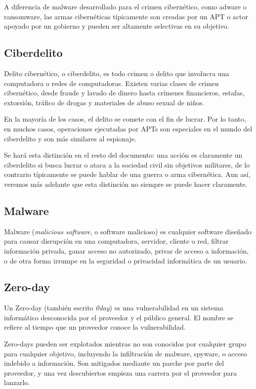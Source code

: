 \documentclass{article}
\begin{document}
A diferencia de malware desarrollado para el crimen cibernético, como adware o ransomware, las armas cibernéticas típicamente son creadas por un APT o actor apoyado por un gobierno y pueden ser altamente selectivas en su objetivo. \autocite{stevens-cyberweapons}

\subsection{Ciberdelito}
Delito cibernético, o ciberdelito, es todo crimen o delito que involucra una computadora o redes de computadoras. Existen varias clases de crimen cibernético, desde fraude y lavado de dinero hasta crímenes financieros, estafas, extorsión, tráfico de drogas y materiales de abuso sexual de niños.

En la mayoría de los casos, el delito se comete con el fin de lucrar. Por lo tanto, en muchos casos, operaciones ejecutadas por APTs son especiales en el mundo del ciberdelito y son más similares al espionaje.

Se hará esta distinción en el resto del documento: una acción es claramente un ciberdelito si busca lucrar o ataca a la sociedad civil sin objetivos militares, de lo contrario típicamente se puede hablar de una guerra o arma cibernética. Aun así, veremos más adelante que esta distinción no siempre se puede hacer claramente. \autocite{cybercrime-britannica}

\subsection{Malware}
Malware ({\it malicious software}, o software malicioso) es cualquier software diseñado para causar disrupción en una computadora, servidor, cliente o red, filtrar información privada, ganar acceso no autorizado, privar de acceso a información, o de otra forma irrumpe en la seguridad o privacidad informática de un usuario. \autocite{tahir-malware}

\subsection{Zero-day}
Un Zero-day (también escrito {\it 0day}) es una vulnerabilidad en un sistema informático desconocida por el proveedor y el público general. El nombre se refiere al tiempo que un proveedor conoce la vulnerabilidad.

Zero-days pueden ser explotados mientras no son conocidos por cualquier grupo para cualquier objetivo, incluyendo la infiltración de malware, spyware, o acceso indebido a información. Son mitigados mediante un parche por parte del proveedor, y una vez descubiertos empieza una carrera por el proveedor para lanzarlo. \autocite{symantec-zeroday}
\end{document}
